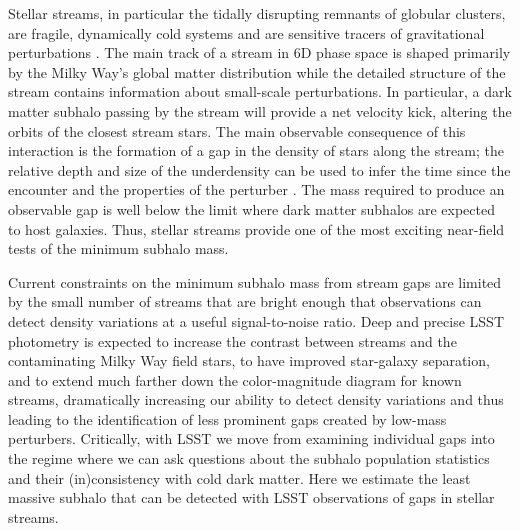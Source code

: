 Stellar streams, in particular the tidally disrupting remnants of globular clusters, are fragile, dynamically cold systems and are sensitive tracers of gravitational perturbations \citep[][]{Carlberg:2012}.
The main track of a stream in 6D phase space is shaped primarily by the Milky Way's global matter distribution while the detailed structure of the stream contains information about small-scale perturbations. 
In particular, a dark matter subhalo passing by the stream will provide a net velocity kick, altering the orbits of the closest stream stars.
The main observable consequence of this interaction is the formation of a gap in the density of stars along the stream; the relative depth and size of the underdensity can be used to infer the time since the encounter and the properties of the perturber \citep{Carlberg:2012, Erkal:2015}. The mass required to produce an observable gap \citep[$10^5-10^6 M_\odot$,][]{erkal2016,bovy:2017} is well below the limit where dark matter subhalos are expected to host galaxies. Thus, stellar streams provide one of the most exciting near-field tests of the minimum subhalo mass.

Current constraints on the minimum subhalo mass from stream gaps are limited by the small number of streams that are bright enough that observations can detect density variations at a useful signal-to-noise ratio. Deep and precise LSST photometry is expected to increase the contrast between streams and the contaminating Milky Way field stars, to have improved star-galaxy separation, and to extend much farther down the color-magnitude diagram for known streams, dramatically increasing our ability to detect density variations and thus leading to the identification of less prominent gaps created by low-mass perturbers. Critically, with LSST we move from examining individual gaps into the regime where we can ask questions about the subhalo population statistics and their (in)consistency with cold dark matter.
Here we estimate the least massive subhalo that can be detected with LSST observations of gaps in stellar streams.

